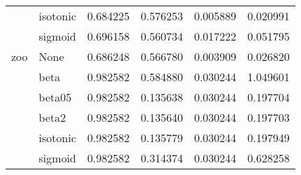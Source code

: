 \begin{tabular}{llrrrr}
        & isotonic &  0.684225 &   0.576253 &  0.005889 &  0.020991 \\
        & sigmoid &  0.696158 &   0.560734 &  0.017222 &  0.051795 \\
zoo & None &  0.686248 &   0.566780 &  0.003909 &  0.026820 \\
        & beta &  0.982582 &   0.584880 &  0.030244 &  1.049601 \\
        & beta05 &  0.982582 &   0.135638 &  0.030244 &  0.197704 \\
        & beta2 &  0.982582 &   0.135640 &  0.030244 &  0.197703 \\
        & isotonic &  0.982582 &   0.135779 &  0.030244 &  0.197949 \\
        & sigmoid &  0.982582 &   0.314374 &  0.030244 &  0.628258 \\
\bottomrule
\end{tabular}
